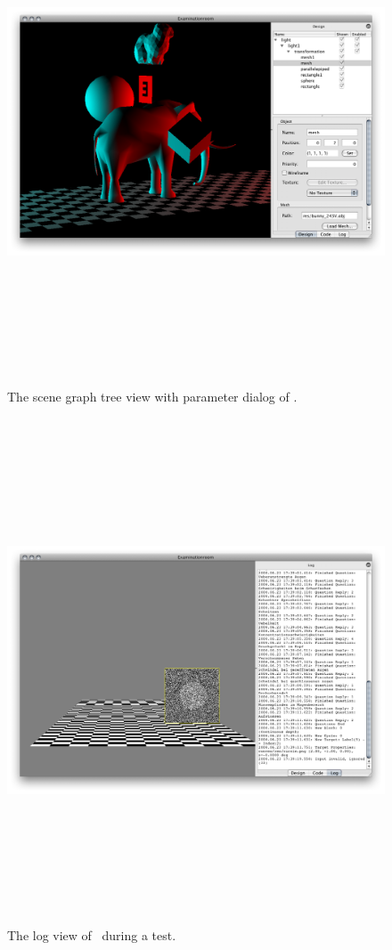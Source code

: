 \begin{figure}
\begin{center}
\includegraphics[height=15cm]{screenshots/ex_tree_screenshot.png}
\caption{The scene graph tree view with parameter dialog of \ER.\label{ssTree}}
\end{center}
\end{figure}

\begin{figure}
\begin{center}
\includegraphics[height=15cm]{screenshots/er_log_screenshot.png}
\caption{The log view of \ER\ during a test.\label{ssLog}}
\end{center}
\end{figure}

\clearpage
